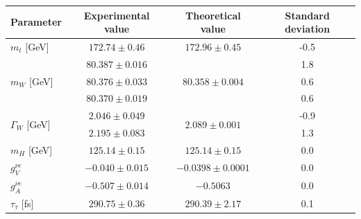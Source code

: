 \begin{table}[]
\centering
\begin{tabular}{|l|c|c|c|}
\hline
\rowcolor[HTML]{9B9B9B} Parameter                                                 & Experimental value                              & Theoretical value                               & Standard deviation \\ \hline \hline
$m_t$ {[}GeV{]}                                           & $172.74 \pm 0.46$                               & $172.96 \pm 0.45$                               & -0.5              \\ \hline
\multirow{3}{*}{$m_W$ {[}GeV{]}}                  & $80.387 \pm 0.016$                              & \multirow{3}{*}{$80.358 \pm 0.004$}             & 1.8               \\ \cline{2-2} \cline{4-4}
                                                  & $80.376 \pm 0.033$                              &                                                 & 0.6               \\ \cline{2-2} \cline{4-4}
                                                          & $80.370 \pm 0.019$                              &                                                 & 0.6               \\ \hline
\multirow{2}{*}{$\Gamma_W$ {[}GeV{]}}             & $2.046 \pm 0.049$                               & \multirow{2}{*}{$2.089 \pm 0.001$}              & -0.9              \\ \cline{2-2} \cline{4-4}
                                                          & $2.195 \pm 0.083$                               &                                                 & 1.3               \\ \hline
$m_H$ {[}GeV{]}                                   & $125.14 \pm 0.15$                                                 & $125.14 \pm 0.15$                               & 0.0               \\ \hline
$g^{\nu e}_V$                                             & $-0.040 \pm 0.015$                              & $-0.0398 \pm 0.0001$                            & 0.0               \\ \hline
$g^{\nu e}_A$                                             & $-0.507 \pm 0.014$                              & $-0.5063$                                       & 0.0               \\ \hline
$\tau_\tau$ {[}fs{]}                                      & $290.75 \pm 0.36$                               & $290.39 \pm 2.17$                               & 0.1               \\ \hline

\end{tabular}
\end{table}
